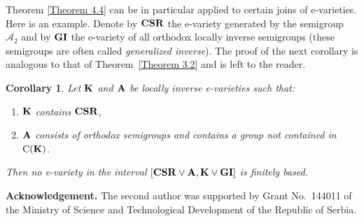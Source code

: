 \documentclass[11pt,reqno]{amsart}
\numberwithin{equation}{section}
\newtheorem{Cor}[Thm]{Corollary}
\theoremstyle{remark}
\def\pv#1{{\bf #1}}
\def\Co{{\mathrm C}}
\begin{document}
Theorem \ref{Theorem 4.4} can be in particular applied to certain
joins of e-varieties. Here is an example. Denote by $\pv{CSR}$ the
e-variety generated by the semigroup $\mathcal{A}_2$  and by $\pv
{GI}$ the e-variety of all orthodox locally inverse semigroups
(these semigroups are often called \emph{generalized inverse}).
The proof of the next corollary is analogous to that of
Theorem~\ref{Theorem 3.2} and is left to the reader.

\begin{Cor} \label{Corollary 4.6} Let $\pv K$ and $\pv A$ be locally inverse
e-varieties such that:
\renewcommand{\labelenumi}{(\theenumi)}
\begin{enumerate}
\item $\pv K$ contains $\pv{CSR}$,
\item $\pv A$ consists of orthodox semigroups and contains a group
not contained in $\Co(\pv K)$.
\end{enumerate}
Then no e-variety in the interval $[\pv{CSR}\vee \pv A, \pv
K\vee\pv {GI}]$ is finitely based.
\end{Cor}

\noindent\textbf{Acknowledgement.} The second author was supported
by Grant No.\ 144011 of the Ministry of Science and Technological
Development of the Republic of Serbia.
\end{document}
